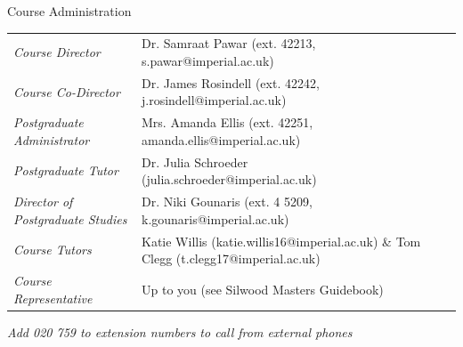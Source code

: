\documentclass[xcolor={usenames,x11names},compress]{beamer}
\renewcommand{\(}{\begin{columns}}
\renewcommand{\)}{\end{columns}}
\newcommand{\<}[1]{\begin{column}{#1}}
\renewcommand{\>}{\end{column}}
\begin{document}
\begin{frame}{Course Administration}

\small
\begin{center}
  \begin{tabular}{>{\it}lP{0.52\textwidth} lP{0.6\textwidth}}
    Course Director & Dr. Samraat Pawar (ext. 42213, 
  s.pawar@imperial.ac.uk)\\
    Course Co-Director  & Dr. James Rosindell (ext. 42242, j.rosindell@imperial.ac.uk)\\
    Postgraduate Administrator	  & Mrs. Amanda Ellis (ext. 42251,  amanda.ellis@imperial.ac.uk)\\
    Postgraduate Tutor	& Dr. Julia Schroeder (julia.schroeder@imperial.ac.uk)\\
		Director of Postgraduate Studies &   Dr. Niki Gounaris (ext. 4 5209, k.gounaris@imperial.ac.uk)\\
		Course Tutors		& Katie Willis (katie.willis16@imperial.ac.uk) \& Tom Clegg (t.clegg17@imperial.ac.uk) \\
    Course Representative	& Up to you (see Silwood Masters Guidebook)\\
  \end{tabular}

\end{center}
{\it Add 020 759 to extension numbers to call from external phones}

\end{frame}
\end{document}
